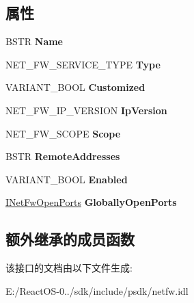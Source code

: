 \subsection*{属性}
\begin{DoxyCompactItemize}
\item 
\mbox{\label{interface_i_net_fw_service_aa728766ed704f268b152e695011e5664}} 
B\+S\+TR {\bfseries Name}
\item 
\mbox{\label{interface_i_net_fw_service_a2460b1230b2a50af862bcf9051b43e8f}} 
N\+E\+T\+\_\+\+F\+W\+\_\+\+S\+E\+R\+V\+I\+C\+E\+\_\+\+T\+Y\+PE {\bfseries Type}
\item 
\mbox{\label{interface_i_net_fw_service_ac1740f57932220c6c79c79edff87863a}} 
V\+A\+R\+I\+A\+N\+T\+\_\+\+B\+O\+OL {\bfseries Customized}
\item 
\mbox{\label{interface_i_net_fw_service_acffd12c8b3e9fdd2432bad90f6500936}} 
N\+E\+T\+\_\+\+F\+W\+\_\+\+I\+P\+\_\+\+V\+E\+R\+S\+I\+ON {\bfseries Ip\+Version}
\item 
\mbox{\label{interface_i_net_fw_service_a707bae20f52ebff51283d7845f088fef}} 
N\+E\+T\+\_\+\+F\+W\+\_\+\+S\+C\+O\+PE {\bfseries Scope}
\item 
\mbox{\label{interface_i_net_fw_service_a98dae601470ccc0e0d6af4fb46c26142}} 
B\+S\+TR {\bfseries Remote\+Addresses}
\item 
\mbox{\label{interface_i_net_fw_service_a91c47f690c6b0b0f2fc23d6bda314658}} 
V\+A\+R\+I\+A\+N\+T\+\_\+\+B\+O\+OL {\bfseries Enabled}
\item 
\mbox{\label{interface_i_net_fw_service_a966a01fd5d51c17c70df76bb2a958fbf}} 
\hyperlink{interface_i_net_fw_open_ports}{I\+Net\+Fw\+Open\+Ports} {\bfseries Globally\+Open\+Ports}
\end{DoxyCompactItemize}
\subsection*{额外继承的成员函数}


该接口的文档由以下文件生成\+:\begin{DoxyCompactItemize}
\item 
E\+:/\+React\+O\+S-\/0../sdk/include/psdk/netfw.\+idl\end{DoxyCompactItemize}
